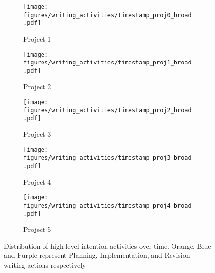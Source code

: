 \begin{figure*}
    \centering
    \begin{subfigure}{0.32\textwidth}
        \texttt{[image: figures/writing\_activities/timestamp\_proj0\_broad.pdf]}
        \caption{Project 1}
    \end{subfigure}
    \begin{subfigure}{0.32\textwidth}
        \texttt{[image: figures/writing\_activities/timestamp\_proj1\_broad.pdf]}
        \caption{Project 2}
    \end{subfigure}
    \begin{subfigure}{0.32\textwidth}
        \texttt{[image: figures/writing\_activities/timestamp\_proj2\_broad.pdf]}
        \caption{Project 3}
    \end{subfigure}
    \begin{subfigure}{0.32\textwidth}
        \texttt{[image: figures/writing\_activities/timestamp\_proj3\_broad.pdf]}
        \caption{Project 4}
    \end{subfigure}
    \begin{subfigure}{0.32\textwidth}
        \texttt{[image: figures/writing\_activities/timestamp\_proj4\_broad.pdf]}
        \caption{Project 5}
    \end{subfigure}
    \caption{Distribution of high-level intention activities over time. Orange, Blue and Purple represent Planning, Implementation, and Revision writing actions respectively.}
    \label{fig:writing-step-broad-all}
\end{figure*}

